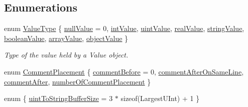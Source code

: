 \subsection*{Enumerations}
\begin{DoxyCompactItemize}
\item 
enum \hyperlink{namespaceJson_a7d654b75c16a57007925868e38212b4e}{Value\+Type} \{ \newline
\hyperlink{namespaceJson_a7d654b75c16a57007925868e38212b4ea7d9899633b4409bd3fc107e6737f8391}{null\+Value} = 0, 
\hyperlink{namespaceJson_a7d654b75c16a57007925868e38212b4eae5a9d708d5c9e23ae9bf98898522512d}{int\+Value}, 
\hyperlink{namespaceJson_a7d654b75c16a57007925868e38212b4eaea788d9a3bb00adc6d68d97d43e1ccd3}{uint\+Value}, 
\hyperlink{namespaceJson_a7d654b75c16a57007925868e38212b4eab837c7b869c14d8be712deb45c9e490e}{real\+Value}, 
\newline
\hyperlink{namespaceJson_a7d654b75c16a57007925868e38212b4ea804ef857affea2d415843c73f261c258}{string\+Value}, 
\hyperlink{namespaceJson_a7d654b75c16a57007925868e38212b4ea14c30dbf4da86f7b809be299f671f7fd}{boolean\+Value}, 
\hyperlink{namespaceJson_a7d654b75c16a57007925868e38212b4eadc8f264f36b55b063c78126b335415f4}{array\+Value}, 
\hyperlink{namespaceJson_a7d654b75c16a57007925868e38212b4eae8386dcfc36d1ae897745f7b4f77a1f6}{object\+Value}
 \}\begin{DoxyCompactList}\small\item\em Type of the value held by a Value object. \end{DoxyCompactList}
\item 
enum \hyperlink{namespaceJson_a4fc417c23905b2ae9e2c47d197a45351}{Comment\+Placement} \{ \hyperlink{namespaceJson_a4fc417c23905b2ae9e2c47d197a45351a52f1733775460517b2ea6bedf4906d52}{comment\+Before} = 0, 
\hyperlink{namespaceJson_a4fc417c23905b2ae9e2c47d197a45351a008a230a0586de54f30b76afe70fdcfa}{comment\+After\+On\+Same\+Line}, 
\hyperlink{namespaceJson_a4fc417c23905b2ae9e2c47d197a45351ac5784ca53b12250888ddb642b06aebef}{comment\+After}, 
\hyperlink{namespaceJson_a4fc417c23905b2ae9e2c47d197a45351abcbd3eb00417335e094e4a03379659b5}{number\+Of\+Comment\+Placement}
 \}
\item 
enum \{ \hyperlink{namespaceJson_a2aacab54ef6fc18e833fbd4982a0a23aae4f2008c7919f20d81286121d1374424}{uint\+To\+String\+Buffer\+Size} = 3 $\ast$ sizeof(Largest\+U\+Int) + 1
 \}
\end{DoxyCompactItemize}
